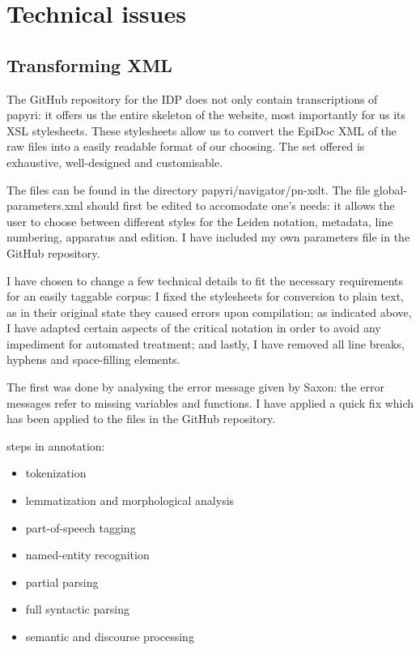 \section{Technical issues}
\label{subsect:techissues}
\subsection{Transforming XML}
\label{subsect:xslt}

The GitHub repository for the IDP does not only contain transcriptions
of papyri: it offers us the entire skeleton of the website, most
importantly for us its XSL stylesheets. These stylesheets allow us to
convert the EpiDoc XML of the raw files into a easily readable format of
our choosing. The set offered is exhaustive, well-designed and
customisable.

The files can be found in the directory papyri/navigator/pn-xslt. The
file global-parameters.xml should first be edited to accomodate one's
needs: it allows the user to choose between different styles for the
Leiden notation, metadata, line numbering, apparatus and edition. I have
included my own parameters file in the GitHub repository.

I have chosen to change a few technical details to fit the necessary
requirements for an easily taggable corpus: I fixed the stylesheets for
conversion to plain text, as in their original state they caused errors upon
compilation; as indicated above, I have adapted certain aspects of the critical
notation in order to avoid any impediment for automated treatment; and lastly,
I have removed all line breaks, hyphens and space-filling elements.

The first was done by analysing the error message given by Saxon: the
error messages refer to missing variables and functions. I have applied
a quick fix which has been applied to the files in the GitHub repository.\

steps in annotation:
\begin{itemize}
	\item tokenization
	\item lemmatization and morphological analysis
	\item part-of-speech tagging
	\item named-entity recognition
	\item partial parsing
	\item full syntactic parsing
	\item semantic and discourse processing
\end{itemize}

